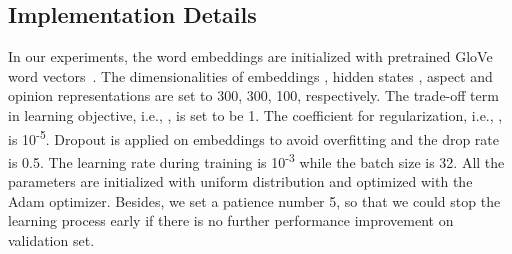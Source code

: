\documentclass[11pt,a4paper]{article}
\begin{document}
\subsection{Implementation Details}

In our experiments, the word embeddings are initialized with pretrained GloVe word vectors~\cite{pennington2014glove}. The dimensionalities of embeddings , hidden states , aspect and opinion representations  are set to 300, 300, 100, respectively. The trade-off term in learning objective, i.e., , is set to be 1. The coefficient for  regularization, i.e., , is 10\textsuperscript{-5}. Dropout is applied on embeddings to avoid overfitting and the drop rate is 0.5. The learning rate during training is 10\textsuperscript{-3} while the batch size is 32. All the parameters are initialized with uniform distribution and optimized with the Adam optimizer. Besides, we set a patience number 5, so that we could stop the learning process early if there is no further performance improvement on validation set. 
\end{document}
